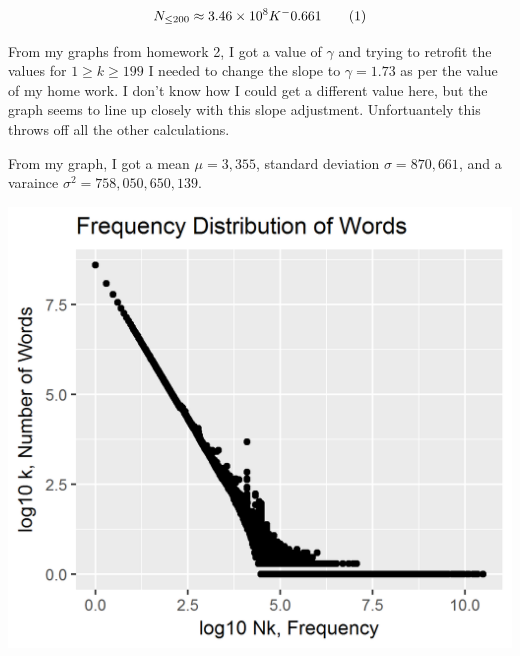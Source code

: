 \[
  N_{\leq 200} \approx 3.46 \times 10^8 K^-0.661
  \addtag
\]

From my graphs from homework 2, I got a value of $\gamma$ and trying to retrofit the values for $1 \ge k \ge 199$ I needed to change the slope to $\gamma = 1.73$ as per the value of my home work. I don't know how I could get a different value here, but the graph seems to line up closely with this slope adjustment. Unfortuantely this throws off all the other calculations. 

From my graph, I got a mean $\mu = 3,355$, standard deviation $\sigma = 870,661$, and a varaince $\sigma^2 = 758,050,650,139$.

\includegraphics{../images/problem_4.png}